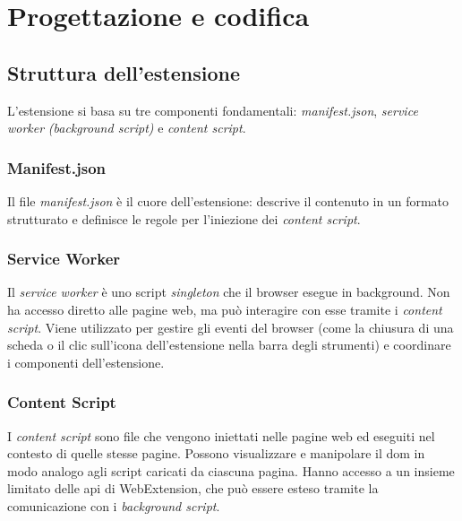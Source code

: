 \chapter{Progettazione e codifica}
\label{cap:progettazione-codifica}


\section{Struttura dell'estensione}
\label{sec:struttura-estensione}

\par L’estensione si basa su tre componenti fondamentali: \textit{manifest.json}, \textit{service worker} \textit{(background script)} e \textit{content script}.

\subsection{Manifest.json}

\par Il file \textit{manifest.json} è il cuore dell’estensione: descrive il contenuto in un formato strutturato e definisce le regole per l'iniezione dei \textit{content script}.

\subsection{Service Worker}

\par Il \textit{service worker} è uno script \textit{singleton} che il browser esegue in background. Non ha accesso diretto alle pagine web, ma può interagire con esse tramite i \textit{content script}. Viene utilizzato per gestire gli eventi del browser (come la chiusura di una scheda o il clic sull’icona dell’estensione nella barra degli strumenti) e coordinare i componenti dell'estensione.

\subsection{Content Script}

\par I \textit{content script} sono file che vengono iniettati nelle pagine web ed eseguiti nel contesto di quelle stesse pagine. Possono visualizzare e manipolare il \gls{dom} in modo analogo agli script caricati da ciascuna pagina. Hanno accesso a un insieme limitato delle \gls{api} di WebExtension, che può essere esteso tramite la comunicazione con i \textit{background script}.

